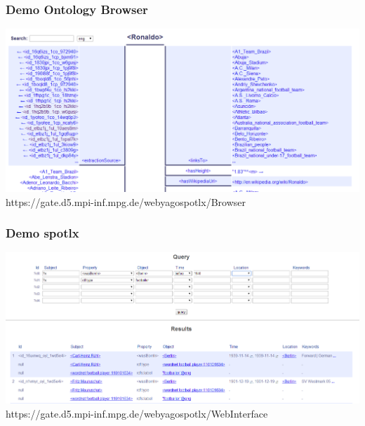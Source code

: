 \begin{frame}
\frametitle{Demo Ontology Browser}
\includegraphics[scale=0.2]{img/yago-obr.png}\\
https://gate.d5.mpi-inf.mpg.de/webyagospotlx/Browser
\end{frame}

\begin{frame}
\frametitle{Demo spotlx}
\includegraphics[scale=0.2]{img/yago-spotnx.png}\\
https://gate.d5.mpi-inf.mpg.de/webyagospotlx/WebInterface
\end{frame}
